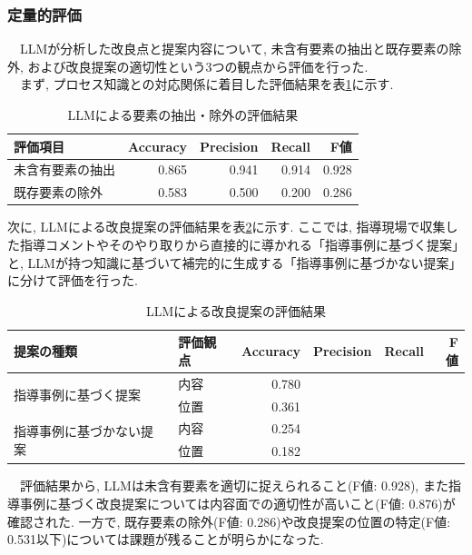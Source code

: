 \subsubsection{定量的評価}
　LLMが分析した改良点と提案内容について, 未含有要素の抽出と既存要素の除外, および改良提案の適切性という3つの観点から評価を行った.\\
　まず, プロセス知識との対応関係に着目した評価結果を表\ref{table_llm_extraction}に示す.

\begin{table}[htbp]
    \centering
    \begin{tabular}{l|rrrr}
        \hline
        評価項目 & Accuracy & Precision & Recall & F値 \\ \hline
        未含有要素の抽出 & 0.865 & 0.941 & 0.914 & 0.928 \\
        既存要素の除外 & 0.583 & 0.500 & 0.200 & 0.286\\
        \hline
    \end{tabular}
    \caption{LLMによる要素の抽出・除外の評価結果}
    \label{table_llm_extraction}
\end{table}

次に, LLMによる改良提案の評価結果を表\ref{table_llm_proposal}に示す. ここでは, 指導現場で収集した指導コメントやそのやり取りから直接的に導かれる「指導事例に基づく提案」と, LLMが持つ知識に基づいて補完的に生成する「指導事例に基づかない提案」に分けて評価を行った.

\begin{table}[htbp]
    \centering
    \begin{tabular}{l|l|rrrr}
        \hline
        提案の種類 & 評価観点 & Accuracy & Precision & Recall & F値 \\ \hline
        \multirow{2}{*}{指導事例に基づく提案} & 内容 & 0.780 \\
        & 位置 & 0.361 \\ \hline
        \multirow{2}{*}{指導事例に基づかない提案} & 内容 & 0.254 \\
        & 位置 & 0.182 \\
        \hline
    \end{tabular}
    \caption{LLMによる改良提案の評価結果}
    \label{table_llm_proposal}
\end{table}

　評価結果から, LLMは未含有要素を適切に捉えられること(F値: 0.928), また指導事例に基づく改良提案については内容面での適切性が高いこと(F値: 0.876)が確認された. 一方で, 既存要素の除外(F値: 0.286)や改良提案の位置の特定(F値: 0.531以下)については課題が残ることが明らかになった.

